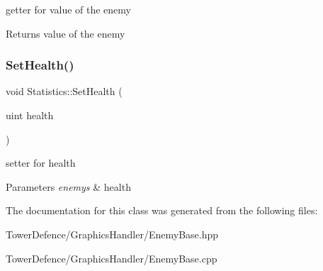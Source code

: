getter for value of the enemy 

\begin{DoxyReturn}{Returns}
value of the enemy 
\end{DoxyReturn}
\mbox{\label{class_statistics_a152114e1a7134507f3f1865f05ae6ac9}} 
\subsubsection{\texorpdfstring{Set\+Health()}{SetHealth()}}
{\footnotesize\ttfamily void Statistics\+::\+Set\+Health (\begin{DoxyParamCaption}\item[{uint}]{health }\end{DoxyParamCaption})}



setter for health 


\begin{DoxyParams}{Parameters}
{\em enemy\textquotesingle{}s} & health \\
\hline
\end{DoxyParams}


The documentation for this class was generated from the following files\+:\begin{DoxyCompactItemize}
\item 
Tower\+Defence/\+Graphics\+Handler/Enemy\+Base.\+hpp\item 
Tower\+Defence/\+Graphics\+Handler/Enemy\+Base.\+cpp\end{DoxyCompactItemize}

